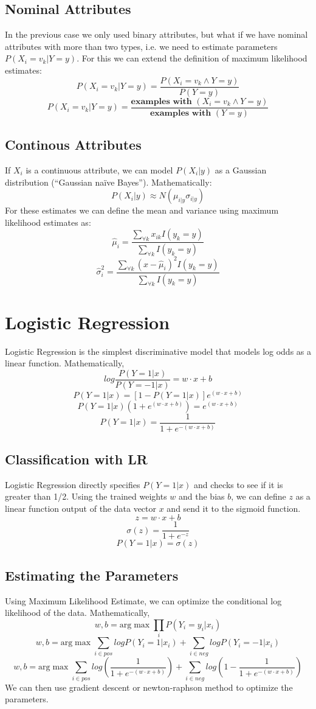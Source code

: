 \documentclass[12pt, a4paper]{book}
\begin{document}
\subsection{Nominal Attributes}
In the previous case we only used binary attributes, but what if we have nominal attributes with more than two types, i.e. we need to estimate parameters $P(X_i=v_k|Y=y)$. For this we can extend the definition of maximum likelihood estimates:
$$P(X_i = v_k|Y=y) = \frac{P(X_i = v_k\land Y=y)}{P(Y=y)}$$
$$P(X_i = v_k|Y=y) = \frac{\textbf{examples with }(X_i = v_k\land Y=y)}{\textbf{examples with }(Y=y)}$$

\subsection{Continous Attributes}
If $X_i$ is a continuous attribute, we can model $P(X_i|y)$ as a Gaussian distribution (“Gaussian naïve Bayes”). Mathematically:
$$P(X_i|y) \approx N(\mu_{i|y}\sigma_{i|y})$$
For these estimates we can define the mean and variance using maximum likelihood estimates as:
$$\hat{\mu}_i = \frac{\sum_{\forall k}x_{ik}I(y_k=y)}{\sum_{\forall k}I(y_k=y)}$$
$$\hat{\sigma}_i^2 = \frac{\sum_{\forall k}(x-\hat{\mu}_i)^2I(y_k=y)}{\sum_{\forall k}I(y_k=y)}$$

\section{Logistic Regression}
Logistic Regression is the simplest discriminative model that models log odds as a linear function. Mathematically,
$$log\frac{P(Y=1|x)}{P(Y=-1|x)} = w\cdot x + b$$
$$P(Y=1|x) = [1-P(Y=1|x)]e^{(w\cdot x+b)}$$
$$P(Y=1|x)(1+e^{(w\cdot x+ b)}) = e^{(w\cdot x + b)}$$
$$P(Y=1|x) = \frac{1}{1+e^{-(w\cdot x+b)}}$$

\subsection{Classification with LR}
Logistic Regression directly specifies $P(Y=1|x)$ and checks to see if it is greater than 1/2. Using the trained weights $w$ and the bias $b$, we can define $z$ as a linear function output of the data vector $x$ and send it to the sigmoid function.
$$z = w\cdot x + b$$
$$\sigma(z) = \frac{1}{1+e^{-z}}$$
$$P(Y=1|x) = \sigma(z)$$

\subsection{Estimating the Parameters}
Using Maximum Likelihood Estimate, we can optimize the conditional log likelihood of the data. Mathematically,
$$w,b = \text{arg}\max\prod_{i}P(Y_i = y_i|x_i)$$
$$w,b = \text{arg}\max\sum_{i \in pos}logP(Y_i=1|x_i)+\sum_{i \in neg}logP(Y_i=-1|x_i)$$
$$w,b = \text{arg}\max\sum_{i \in pos}log\left(\frac{1}{1+e^{-(w\cdot x+b)}}\right)+\sum_{i \in neg}log\left(1-\frac{1}{1+e^{-(w\cdot x + b)}}\right)$$
We can then use gradient descent or newton-raphson method to optimize the parameters.
\end{document}
